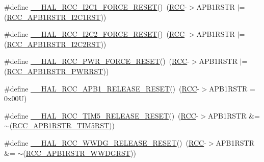 \begin{DoxyCompactItemize}
\item 
\#define \hyperlink{group___r_c_c___a_p_b1___force___release___reset_ga551c171f88af86ca985db634ac9e3275}{\+\_\+\+\_\+\+H\+A\+L\+\_\+\+R\+C\+C\+\_\+\+I2\+C1\+\_\+\+F\+O\+R\+C\+E\+\_\+\+R\+E\+S\+ET}()~(\hyperlink{group___peripheral__declaration_ga74944438a086975793d26ae48d5882d4}{R\+CC}-\/$>$A\+P\+B1\+R\+S\+TR $\vert$= (\hyperlink{group___peripheral___registers___bits___definition_gadcd25346a7d7b0009090adfbca899b93}{R\+C\+C\+\_\+\+A\+P\+B1\+R\+S\+T\+R\+\_\+\+I2\+C1\+R\+ST}))
\item 
\#define \hyperlink{group___r_c_c___a_p_b1___force___release___reset_gaed404dfdc9bc032cf718b7ed17f664f0}{\+\_\+\+\_\+\+H\+A\+L\+\_\+\+R\+C\+C\+\_\+\+I2\+C2\+\_\+\+F\+O\+R\+C\+E\+\_\+\+R\+E\+S\+ET}()~(\hyperlink{group___peripheral__declaration_ga74944438a086975793d26ae48d5882d4}{R\+CC}-\/$>$A\+P\+B1\+R\+S\+TR $\vert$= (\hyperlink{group___peripheral___registers___bits___definition_ga412d59407e5dad43cf8ae1ea6f8bc5c3}{R\+C\+C\+\_\+\+A\+P\+B1\+R\+S\+T\+R\+\_\+\+I2\+C2\+R\+ST}))
\item 
\#define \hyperlink{group___r_c_c___a_p_b1___force___release___reset_gaf454341fae45fdfacfea2f45c07ce3e0}{\+\_\+\+\_\+\+H\+A\+L\+\_\+\+R\+C\+C\+\_\+\+P\+W\+R\+\_\+\+F\+O\+R\+C\+E\+\_\+\+R\+E\+S\+ET}()~(\hyperlink{group___peripheral__declaration_ga74944438a086975793d26ae48d5882d4}{R\+CC}-\/$>$A\+P\+B1\+R\+S\+TR $\vert$= (\hyperlink{group___peripheral___registers___bits___definition_ga274d8cb48f0e89831efabea66d64af2a}{R\+C\+C\+\_\+\+A\+P\+B1\+R\+S\+T\+R\+\_\+\+P\+W\+R\+R\+ST}))
\item 
\#define \hyperlink{group___r_c_c___a_p_b1___force___release___reset_ga9d0742ab271ace3dbe1a4e83de3d017b}{\+\_\+\+\_\+\+H\+A\+L\+\_\+\+R\+C\+C\+\_\+\+A\+P\+B1\+\_\+\+R\+E\+L\+E\+A\+S\+E\+\_\+\+R\+E\+S\+ET}()~(\hyperlink{group___peripheral__declaration_ga74944438a086975793d26ae48d5882d4}{R\+CC}-\/$>$A\+P\+B1\+R\+S\+TR = 0x00\+U)
\item 
\#define \hyperlink{group___r_c_c___a_p_b1___force___release___reset_gaf7e0cde5ea8f6425d87ebf2d91e8b360}{\+\_\+\+\_\+\+H\+A\+L\+\_\+\+R\+C\+C\+\_\+\+T\+I\+M5\+\_\+\+R\+E\+L\+E\+A\+S\+E\+\_\+\+R\+E\+S\+ET}()~(\hyperlink{group___peripheral__declaration_ga74944438a086975793d26ae48d5882d4}{R\+CC}-\/$>$A\+P\+B1\+R\+S\+TR \&= $\sim$(\hyperlink{group___peripheral___registers___bits___definition_ga1d1233dd5266ba55d9951e3b1a334552}{R\+C\+C\+\_\+\+A\+P\+B1\+R\+S\+T\+R\+\_\+\+T\+I\+M5\+R\+ST}))
\item 
\#define \hyperlink{group___r_c_c___a_p_b1___force___release___reset_ga63fa37b173c2c1d9249389148f96e5f1}{\+\_\+\+\_\+\+H\+A\+L\+\_\+\+R\+C\+C\+\_\+\+W\+W\+D\+G\+\_\+\+R\+E\+L\+E\+A\+S\+E\+\_\+\+R\+E\+S\+ET}()~(\hyperlink{group___peripheral__declaration_ga74944438a086975793d26ae48d5882d4}{R\+CC}-\/$>$A\+P\+B1\+R\+S\+TR \&= $\sim$(\hyperlink{group___peripheral___registers___bits___definition_ga0d2591ac0655a8798f4c16cef97e6f94}{R\+C\+C\+\_\+\+A\+P\+B1\+R\+S\+T\+R\+\_\+\+W\+W\+D\+G\+R\+ST}))

\end{DoxyCompactItemize}
